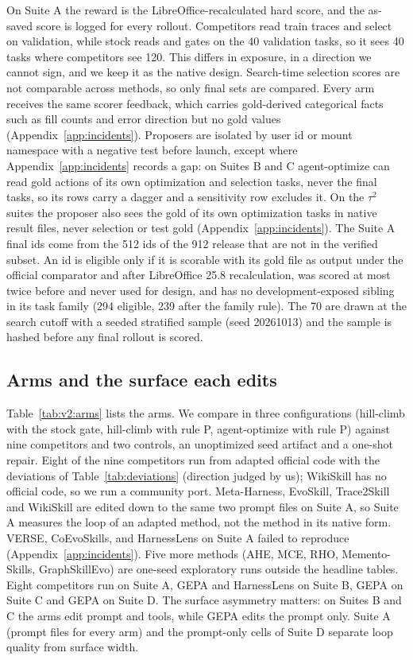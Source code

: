 On Suite A the reward is the LibreOffice-recalculated hard score, and the as-saved score is logged for every rollout. Competitors read train traces and select on validation, while stock \capevolve{} reads and gates on the 40 validation tasks, so it sees 40 tasks where competitors see 120. This differs in exposure, in a direction we cannot sign, and we keep it as the native design. Search-time selection scores are not comparable across methods, so only final sets are compared. Every arm receives the same scorer feedback, which carries gold-derived categorical facts such as fill counts and error direction but no gold values (Appendix~\ref{app:incidents}). Proposers are isolated by user id or mount namespace with a negative test before launch, except where Appendix~\ref{app:incidents} records a gap: on Suites B and C agent-optimize can read gold actions of its own optimization and selection tasks, never the final tasks, so its rows carry a dagger and a sensitivity row excludes it. On the $\tau^2$ suites the \capevolve{} proposer also sees the gold of its own optimization tasks in native result files, never selection or test gold (Appendix~\ref{app:incidents}). The Suite A final ids come from the 512 ids of the 912 release that are not in the verified subset. An id is eligible only if it is scorable with its gold file as output under the official comparator and after LibreOffice 25.8 recalculation, was scored at most twice before and never used for design, and has no development-exposed sibling in its task family (294 eligible, 239 after the family rule). The 70 are drawn at the search cutoff with a seeded stratified sample (seed 20261013) and the sample is hashed before any final rollout is scored.

\subsection{Arms and the surface each edits}

Table~\ref{tab:v2:arms} lists the arms. We compare \capevolve{} in three configurations (hill-climb with the stock gate, hill-climb with rule P, agent-optimize with rule P) against nine competitors and two controls, an unoptimized seed artifact and a one-shot repair. Eight of the nine competitors run from adapted official code with the deviations of Table~\ref{tab:deviations} (direction judged by us); WikiSkill has no official code, so we run a community port. Meta-Harness, EvoSkill, Trace2Skill and WikiSkill are edited down to the same two prompt files on Suite A, so Suite A measures the loop of an adapted method, not the method in its native form. VERSE, CoEvoSkills, and HarnessLens on Suite A failed to reproduce (Appendix~\ref{app:incidents}). Five more methods (AHE, MCE, RHO, Memento-Skills, GraphSkillEvo) are one-seed exploratory runs outside the headline tables. Eight competitors run on Suite A, GEPA and HarnessLens on Suite B, GEPA on Suite C and GEPA on Suite D. The surface asymmetry matters: on Suites B and C the \capevolve{} arms edit prompt and tools, while GEPA edits the prompt only. Suite A (prompt files for every arm) and the prompt-only cells of Suite D separate loop quality from surface width.

